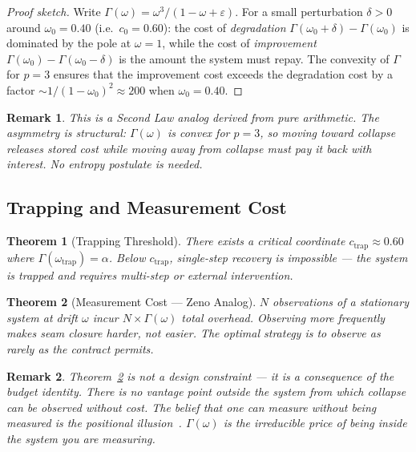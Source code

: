 \documentclass[
  aps,
  prd,
  preprint,
  superscriptaddress,
  nofootinbib,
  floatfix,
  longbibliography
]{revtex4-2}
\newtheorem{theorem}{Theorem}
\newtheorem{remark}{Remark}
\newcommand{\Gam}{\Gamma}
\newcommand{\eps}{\varepsilon}
\newcommand{\Drft}{\omega}
\begin{document}
\begin{proof}[Proof sketch]
Write $\Gam(\Drft) = \Drft^3/(1-\Drft+\eps)$.
For a small perturbation $\delta > 0$ around
$\Drft_0 = 0.40$ (i.e.\ $c_0 = 0.60$):
the cost of \emph{degradation}
$\Gam(\Drft_0+\delta) - \Gam(\Drft_0)$ is dominated
by the pole at $\Drft = 1$, while the cost of
\emph{improvement} $\Gam(\Drft_0) - \Gam(\Drft_0-\delta)$
is the amount the system must repay.
The convexity of $\Gam$ for $p = 3$ ensures that the
improvement cost exceeds the degradation cost by
a factor $\sim 1/(1-\Drft_0)^2 \approx 200$
when $\Drft_0 = 0.40$.
\end{proof}

\begin{remark}
This is a Second Law analog derived from pure arithmetic.
The asymmetry is structural: $\Gam(\Drft)$ is convex for
$p = 3$, so moving toward collapse releases stored cost
while moving away from collapse must pay it back with interest.
No entropy postulate is needed.
\end{remark}

\subsection{Trapping and Measurement Cost}

\begin{theorem}[Trapping Threshold]\label{thm:trap}
There exists a critical coordinate $c_{\mathrm{trap}}
\approx 0.60$ where $\Gam(\Drft_{\mathrm{trap}}) = \alpha$.
Below $c_{\mathrm{trap}}$, single-step recovery is
impossible — the system is trapped and requires
multi-step or external intervention.
\end{theorem}

\begin{theorem}[Measurement Cost — Zeno Analog]\label{thm:zeno}
$N$ observations of a stationary system at drift $\Drft$
incur $N \times \Gam(\Drft)$ total overhead.
Observing more frequently makes seam closure \emph{harder},
not easier.
The optimal strategy is to observe as rarely as the
contract permits.
\end{theorem}

\begin{remark}
Theorem~\ref{thm:zeno} is not a design constraint — it is
a consequence of the budget identity.
There is no vantage point outside the system from which
collapse can be observed without cost.
The belief that one can measure without being measured is
the \emph{positional illusion}~\cite{paulus2025gor}.
$\Gam(\Drft)$ is the irreducible price of being inside
the system you are measuring.
\end{remark}
\end{document}
